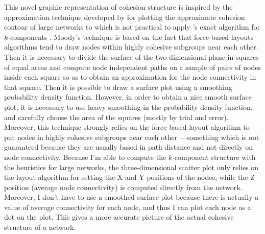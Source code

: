 This novel graphic representation of cohesion structure is inspired by the approximation technique developed by \citet{moody:2004} for plotting the approximate cohesion contour of large networks to which is not practical to apply \citeauthor{moody:2003}'s exact algorithm for $k$-components \citeyear{moody:2003}. Moody's technique is based on the fact that force-based layouts algorithms tend to draw nodes within highly cohesive subgroups near each other. Then it is necessary to divide the surface of the two-dimensional plane in squares of equal areas and compute node independent paths on a sample of pairs of nodes inside each square so as to obtain an approximation for the node connectivity in that square. Then it is possible to draw a surface plot using a smoothing probability density function. However, in order to obtain a nice smooth surface plot, it is necessary to use heavy smoothing in the probability density function, and carefully choose the area of the squares (mostly by trial and error). Moreover, this technique strongly relies on the force-based layout algorithm to put nodes in highly cohesive subgroups near each other ---something which is not guaranteed because they are usually based in path distance and not directly on node connectivity. Because I'm able to compute the $k$-component structure with the heuristics for large networks, the three-dimensional scatter plot only relies on the layout algorithm for setting the X and Y positions of the nodes, while the Z position (average node connectivity) is computed directly from the network. Moreover, I don't have to use a smoothed surface plot because there is actually a value of average connectivity for each node, and thus I can plot each node as a dot on the plot. This gives a more accurate picture of the actual cohesive structure of a network.

